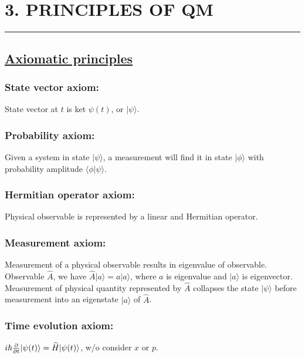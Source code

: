 \section{3. PRINCIPLES OF QM} \hrule height 0.3pt 

\subsection{\underline{Axiomatic principles}}

\subsubsection{State vector axiom:} State vector at $t$ is ket $\psi(t)$, or $|\psi \rangle$.

\subsubsection{Probability axiom:} Given a system in state $|\psi \rangle$, a measurement will find it in state $|\phi \rangle$ with probability amplitude $\langle \phi | \psi \rangle$. 

\subsubsection{Hermitian operator axiom:} Physical observable is represented by a linear and Hermitian operator.

\subsubsection{Measurement axiom:} Measurement of a physical observable results in eigenvalue of observable. Observable $\widehat{A}$, we have $\widehat{A} | a \rangle = a | a \rangle$, where $a$ is eigenvalue and $|a \rangle$ is eigenvector. Measurement of physical quantity represented by $\widehat{A}$ collapses the state $|\psi \rangle$ before measurement into an eigenstate $|a \rangle$ of $\widehat{A}$.

\subsubsection{Time evolution axiom:} $i \hbar \pdv{}{t} | \psi(t) \rangle = \widehat{H} |\psi(t) \rangle$, w/o consider $x$ or $p$.

